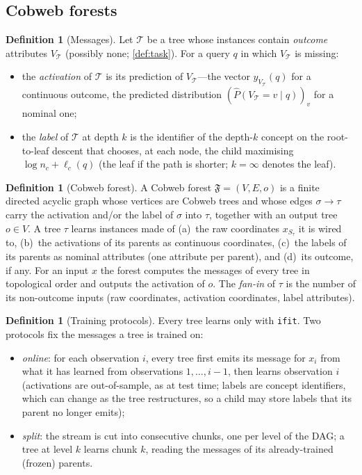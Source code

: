 \documentclass[11pt]{article}
\theoremstyle{definition}
\newtheorem{definition}[theorem]{Definition}
\theoremstyle{remark}
\newcommand{\T}{\mathcal{T}}
\newcommand{\F}{\mathfrak{F}}
\newcommand{\hy}{\hat{y}}
\begin{document}
\subsection{Cobweb forests}

\begin{definition}[Messages]\label{def:messages}
Let $\T$ be a tree whose instances contain \emph{outcome} attributes $V_\T$ (possibly
none; \cref{def:task}).  For a query $q$ in which $V_\T$ is missing:
\begin{itemize}[leftmargin=*]
\item the \emph{activation} of $\T$ is its prediction of $V_\T$---the vector
  $\hy_{V_\T}(q)$ for a continuous outcome, the predicted distribution
  $(\hat P(V_\T{=}v\mid q))_v$ for a nominal one;
\item the \emph{label} of $\T$ at depth $k$ is the identifier of the depth-$k$ concept
  on the root-to-leaf descent that chooses, at each node, the child maximising
  $\log n_c+\ell_c(q)$ (the leaf if the path is shorter; $k=\infty$ denotes the leaf).
\end{itemize}
\end{definition}

\begin{definition}[Cobweb forest]\label{def:forest}
A Cobweb forest $\F=(V,E,o)$ is a finite directed acyclic graph whose vertices are
Cobweb trees and whose edges $\sigma\to\tau$ carry the activation and/or the label of
$\sigma$ into $\tau$, together with an output tree $o\in V$.  A tree $\tau$ learns
instances made of (a)~the raw coordinates $x_{S_\tau}$ it is wired to, (b)~the activations
of its parents as continuous coordinates, (c)~the labels of its parents as nominal
attributes (one attribute per parent), and (d)~its outcome, if any.  For an input $x$
the forest computes the messages of every tree in topological order and outputs the
activation of $o$.  The \emph{fan-in} of $\tau$ is the number of its non-outcome inputs
(raw coordinates, activation coordinates, label attributes).
\end{definition}

\begin{definition}[Training protocols]\label{def:forestlearn}
Every tree learns only with \texttt{ifit}.  Two protocols fix the messages a tree is
trained on:
\begin{itemize}[leftmargin=*]
\item \emph{online}: for each observation $i$, every tree first emits its message for
  $x_i$ from what it has learned from observations $1,\dots,i-1$, then learns
    observation $i$ (activations are out-of-sample, as at test time; labels are concept
  identifiers, which can change as the tree restructures, so a child may store labels
  that its parent no longer emits);
\item \emph{split}: the stream is cut into consecutive chunks, one per level of the DAG;
  a tree at level $k$ learns chunk $k$, reading the messages of its already-trained
  (frozen) parents.
\end{itemize}
\end{definition}
\end{document}
